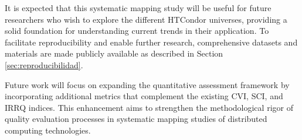 It is expected that this systematic mapping study will be useful for future researchers who wish to explore the different HTCondor universes, providing a solid foundation for understanding current trends in their application. To facilitate reproducibility and enable further research, comprehensive datasets and materials are made publicly available as described in Section \ref{sec:reproducibilidad}.

Future work will focus on expanding the quantitative assessment framework by incorporating additional metrics that complement the existing CVI, SCI, and IRRQ indices. This enhancement aims to strengthen the methodological rigor of quality evaluation processes in systematic mapping studies of distributed computing technologies.